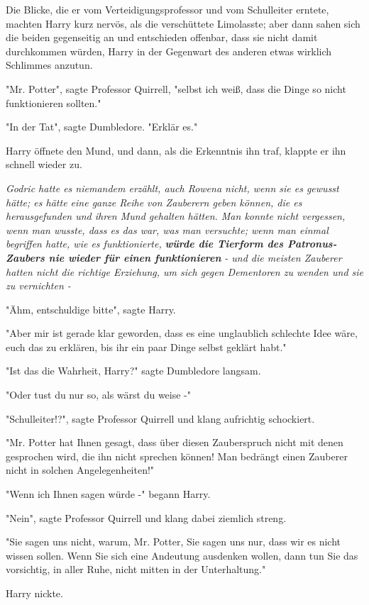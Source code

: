 {Die Blicke, die er vom Verteidigungsprofessor und vom Schulleiter erntete, machten Harry kurz nervös, als die verschüttete Limolasste; aber dann sahen sich die beiden gegenseitig an und entschieden offenbar, dass sie nicht damit durchkommen würden, Harry in der Gegenwart des anderen etwas wirklich Schlimmes anzutun.

"Mr. Potter", sagte Professor Quirrell, "selbst ich weiß, dass die Dinge so nicht funktionieren sollten."

"In der Tat", sagte Dumbledore. "Erklär es."

Harry öffnete den Mund, und dann, als die Erkenntnis ihn traf, klappte er ihn schnell wieder zu.

\emph{Godric hatte es niemandem erzählt, auch Rowena nicht, wenn sie es gewusst hätte; es hätte eine ganze Reihe von Zauberern geben können, die es herausgefunden und ihren Mund gehalten hätten. Man konnte nicht vergessen, wenn man wusste, dass es das war, was man versuchte; wenn man einmal begriffen hatte, wie es funktionierte,} \textbf{\emph{würde die Tierform des Patronus-Zaubers nie wieder für einen funktionieren}} \emph{- und die meisten Zauberer hatten nicht die richtige Erziehung, um sich gegen Dementoren zu wenden und sie zu vernichten -}

"Ähm, entschuldige bitte", sagte Harry.

"Aber mir ist gerade klar geworden, dass es eine unglaublich schlechte Idee wäre, euch das zu erklären, bis ihr ein paar Dinge selbst geklärt habt."

"Ist das die Wahrheit, Harry?" sagte Dumbledore langsam.

"Oder tust du nur so, als wärst du weise -"

"Schulleiter!?", sagte Professor Quirrell und klang aufrichtig schockiert.

"Mr. Potter hat Ihnen gesagt, dass über diesen Zauberspruch nicht mit denen gesprochen wird, die ihn nicht sprechen können! Man bedrängt einen Zauberer nicht in solchen Angelegenheiten!"

"Wenn ich Ihnen sagen würde -" begann Harry.

"Nein", sagte Professor Quirrell und klang dabei ziemlich streng.

"Sie sagen uns nicht, warum, Mr. Potter, Sie sagen uns nur, dass wir es nicht wissen sollen. Wenn Sie sich eine Andeutung ausdenken wollen, dann tun Sie das vorsichtig, in aller Ruhe, nicht mitten in der Unterhaltung."

Harry nickte.

}

